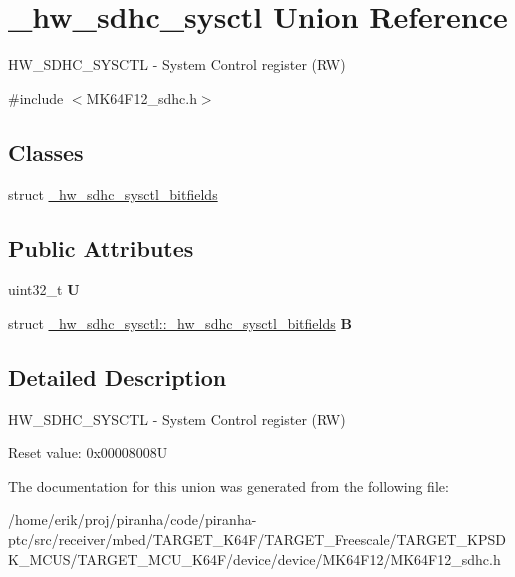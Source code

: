 \hypertarget{union__hw__sdhc__sysctl}{}\section{\+\_\+hw\+\_\+sdhc\+\_\+sysctl Union Reference}
\label{union__hw__sdhc__sysctl}


H\+W\+\_\+\+S\+D\+H\+C\+\_\+\+S\+Y\+S\+C\+TL -\/ System Control register (RW)  




{\ttfamily \#include $<$M\+K64\+F12\+\_\+sdhc.\+h$>$}

\subsection*{Classes}
\begin{DoxyCompactItemize}
\item 
struct \hyperlink{struct__hw__sdhc__sysctl_1_1__hw__sdhc__sysctl__bitfields}{\+\_\+hw\+\_\+sdhc\+\_\+sysctl\+\_\+bitfields}
\end{DoxyCompactItemize}
\subsection*{Public Attributes}
\begin{DoxyCompactItemize}
\item 
uint32\+\_\+t {\bfseries U}\hypertarget{union__hw__sdhc__sysctl_ab53f44df030dbd71b2634b3118cdd166}{}\label{union__hw__sdhc__sysctl_ab53f44df030dbd71b2634b3118cdd166}

\item 
struct \hyperlink{struct__hw__sdhc__sysctl_1_1__hw__sdhc__sysctl__bitfields}{\+\_\+hw\+\_\+sdhc\+\_\+sysctl\+::\+\_\+hw\+\_\+sdhc\+\_\+sysctl\+\_\+bitfields} {\bfseries B}\hypertarget{union__hw__sdhc__sysctl_a291c1b80dceb26e2bbc0b7fd3f5f8dab}{}\label{union__hw__sdhc__sysctl_a291c1b80dceb26e2bbc0b7fd3f5f8dab}

\end{DoxyCompactItemize}


\subsection{Detailed Description}
H\+W\+\_\+\+S\+D\+H\+C\+\_\+\+S\+Y\+S\+C\+TL -\/ System Control register (RW) 

Reset value\+: 0x00008008U 

The documentation for this union was generated from the following file\+:\begin{DoxyCompactItemize}
\item 
/home/erik/proj/piranha/code/piranha-\/ptc/src/receiver/mbed/\+T\+A\+R\+G\+E\+T\+\_\+\+K64\+F/\+T\+A\+R\+G\+E\+T\+\_\+\+Freescale/\+T\+A\+R\+G\+E\+T\+\_\+\+K\+P\+S\+D\+K\+\_\+\+M\+C\+U\+S/\+T\+A\+R\+G\+E\+T\+\_\+\+M\+C\+U\+\_\+\+K64\+F/device/device/\+M\+K64\+F12/M\+K64\+F12\+\_\+sdhc.\+h\end{DoxyCompactItemize}
